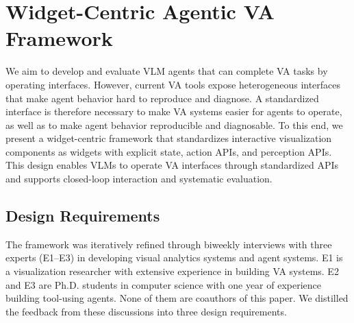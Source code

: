 \section{Widget-Centric Agentic VA Framework}
\label{sec:framework}

We aim to develop and evaluate VLM agents that can complete VA tasks by operating interfaces.
However, current VA tools expose heterogeneous interfaces that make agent behavior hard to reproduce and diagnose.
A standardized interface is therefore necessary to make VA systems easier for agents to operate, as well as to make agent behavior reproducible and diagnosable.
To this end, we present a widget-centric framework that standardizes interactive visualization components as widgets with explicit state, action APIs, and perception APIs.
This design enables VLMs to operate VA interfaces through standardized APIs and supports closed-loop interaction and systematic evaluation.


\subsection{Design Requirements}
\label{sec:framework_rationale}


The framework was iteratively refined through biweekly interviews with three experts (E1--E3) in developing visual analytics systems and agent systems.
E1 is a visualization researcher with extensive experience in building VA systems.
E2 and E3 are Ph.D. students in computer science with one year of experience building tool-using agents.
None of them are coauthors of this paper.
We distilled the feedback from these discussions into three design requirements.






